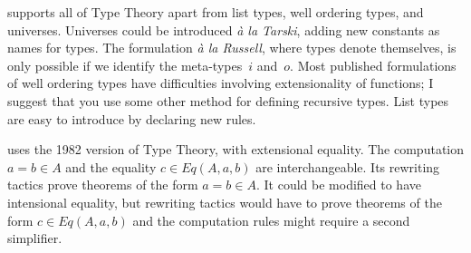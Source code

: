 {\CTT} supports all of Type Theory apart from list types, well ordering
types, and universes.  Universes could be introduced {\em\`a la Tarski},
adding new constants as names for types.  The formulation {\em\`a la
Russell}, where types denote themselves, is only possible if we identify
the meta-types~$i$ and~$o$.  Most published formulations of well ordering
types have difficulties involving extensionality of functions; I suggest
that you use some other method for defining recursive types.  List types
are easy to introduce by declaring new rules.

{\CTT} uses the 1982 version of Type Theory, with extensional equality.
The computation $a=b\in A$ and the equality $c\in Eq(A,a,b)$ are
interchangeable.  Its rewriting tactics prove theorems of the form $a=b\in
A$.  It could be modified to have intensional equality, but rewriting
tactics would have to prove theorems of the form $c\in Eq(A,a,b)$ and the
computation rules might require a second simplifier.


